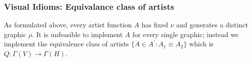 \documentclass[../main.tex]{subfiles}
\begin{document}
\subsubsection{Visual Idioms: Equivalance class of artists}
As formulated above, every artist function $A$ has fixed $\nu$ and generates a distinct graphic $\rho$. It is unfeasible to implement $A$ for every single graphic; instead we implement the equivalence class of artists $\{A \in A^\prime: A_{1} \equiv A_{2}\}$ which is $Q:\Gamma(V) \rightarrow \Gamma(H)$. 

\end{document}
